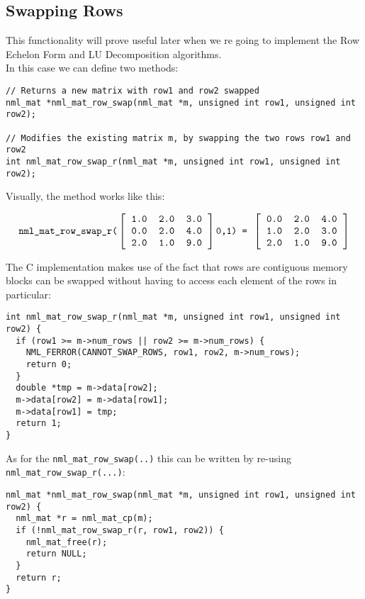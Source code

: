 \subsection{Swapping Rows}

This functionality will prove useful later when we re going to implement the Row Echelon Form and LU Decomposition algorithms.
\\

In this case we can define two methods:

\begin{verbatim}
// Returns a new matrix with row1 and row2 swapped
nml_mat *nml_mat_row_swap(nml_mat *m, unsigned int row1, unsigned int row2);

// Modifies the existing matrix m, by swapping the two rows row1 and row2
int nml_mat_row_swap_r(nml_mat *m, unsigned int row1, unsigned int row2);
\end{verbatim}

Visually, the method works like this:

$$
\texttt{nml\_mat\_row\_swap\_r(}
\left[ \begin{tabular}{rrr}
\tt 1.0 & \tt 2.0 & \tt 3.0 \\
\tt 0.0 & \tt 2.0 & \tt 4.0 \\
\tt 2.0 & \tt 1.0 & \tt 9.0
\end{tabular} \right]
\texttt{0,1) = }
\left[ \begin{tabular}{rrr}
\tt 0.0 & \tt 2.0 & \tt 4.0 \\
\tt 1.0 & \tt 2.0 & \tt 3.0 \\
\tt 2.0 & \tt 1.0 & \tt 9.0
\end{tabular} \right]
$$

The C implementation makes use of the fact that rows are contiguous memory blocks can be swapped without having to access each element of the rows in particular:

\begin{verbatim}
int nml_mat_row_swap_r(nml_mat *m, unsigned int row1, unsigned int row2) {
  if (row1 >= m->num_rows || row2 >= m->num_rows) {
    NML_FERROR(CANNOT_SWAP_ROWS, row1, row2, m->num_rows);
    return 0;
  }
  double *tmp = m->data[row2];
  m->data[row2] = m->data[row1];
  m->data[row1] = tmp;
  return 1;
} 
\end{verbatim}

As for the {\tt nml\_mat\_row\_swap(..)} this can be written by re-using {\tt nml\_mat\_row\_swap\_r(...)}:

\begin{verbatim}
nml_mat *nml_mat_row_swap(nml_mat *m, unsigned int row1, unsigned int row2) {
  nml_mat *r = nml_mat_cp(m);
  if (!nml_mat_row_swap_r(r, row1, row2)) {
    nml_mat_free(r);
    return NULL;
  }
  return r;
} 
\end{verbatim}

